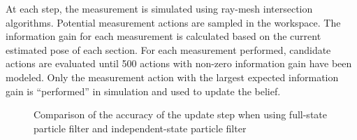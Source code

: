 \documentclass[../thesis.tex]{subfiles}
\begin{document}
At each step, the measurement is simulated using ray-mesh intersection algorithms\cite{Saund2017}. 
Potential measurement actions are sampled in the workspace. 
The information gain for each measurement is calculated based on the current estimated pose of each section.
For each measurement performed, candidate actions are evaluated until 500 actions with non-zero information gain have been modeled.
Only the measurement action with the largest expected information gain is ``performed'' in simulation and used to update the belief. 
\begin{figure}
\centering
{}


\caption{Comparison of the accuracy of the update step when using full-state particle filter and independent-state particle filter}
\label{fig:Simulation}
\end{figure}
\end{document}
